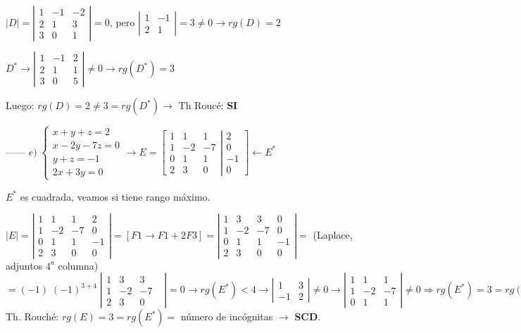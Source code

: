 \begin{proofw}
$|D|=\left| \begin{matrix}  1&-1&-2\\2&1&3\\3&0&1 
\end{matrix} \right|=0$, pero $\left| \begin{matrix} 1&-1\\2&1 \end{matrix} \right|=3\neq 0 \to rg(D)=2$

$D^*\to  \left| \begin{matrix} 1&-1&2\\2&1&1\\3&0&5 \end{matrix} \right|\neq 0 \to rg(D^*)=3  $

Luego: $rg(D)=2\neq 3=rg(D^*) \to $ Th Roucé: \textbf{SI}

------ $e) \; \begin{cases}  x+y+z=2\\x-2y-7z=0\\y+z=-1\\2x+3y=0 \end{cases} \to E=\left[ \begin{matrix} 1&1&1\\1&-2&-7\\0&1&1\\2&3&0  
\end{matrix} \right| \left. \begin{matrix} 
 	2\\0\\-1\\0
 \end{matrix} \right] \leftarrow E^*$

$E^*$ es cuadrada, veamos si tiene rango máximo.

$|E|=\left| \begin{matrix} 1&1&1&2\\1&-2&-7&0\\0&1&1&-1\\2&3&0&0  
\end{matrix} \right|= [F1\to F1+2F3] = \left| \begin{matrix} 1&3&3&0\\1&-2&-7&0\\0&1&1&\boxed{-1}\\2&3&0&0  
\end{matrix} \right| =$ \textcolor{gris}{(Laplace, adjuntos $4^a$ columna)} $ =(-1)\; (-1)^{3+4}\; \left| \begin{matrix} 1&3&3\\1&-2&-7\\2&3&0&  
\end{matrix} \right|=0 \to rg(E^*)<4 \to \left| \begin{matrix} 1&3\\-1&2 \end{matrix} \right| \neq 0 \to \left| \begin{matrix}  1&1&1\\1&-2&-7\\0&1&1 \end{matrix} \right| \neq 0 \Rightarrow rg(E^*)=3=rg(E) \to $ Th. Rouché: $rg(E)=3=rg(E^*)= $ número de incógnitas $\to$ \textbf{SCD}.


\end{proofw}
